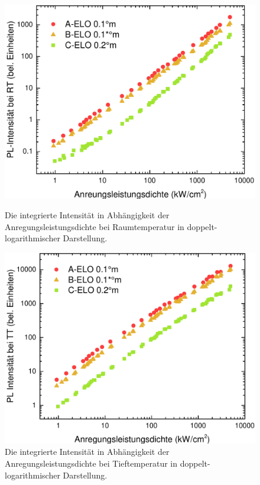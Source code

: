 \begin{figure}[ht]
  \centering
  \begin{minipage}[t]{0.49\textwidth}
    \centering
    \includegraphics[width=\textwidth]{Bilder/TS4045/intRT.pdf}
		\caption{Die integrierte Intensität in Abhängigkeit der Anregungsleistungsdichte bei Raumtemperatur in doppelt-logarithmischer Darstellung.}
    \label{fig:eloINTrt}
  \end{minipage}
	\hfill
  \begin{minipage}[t]{0.49\textwidth}
    \centering
    \includegraphics[width=\linewidth]{Bilder/TS4045/intTT.pdf}
		\caption{Die integrierte Intensität in Abhängigkeit der Anregungsleistungsdichte bei Tieftemperatur in doppelt-logarithmischer Darstellung.}
    \label{fig:eloINTtt}
  \end{minipage}
\end{figure}
